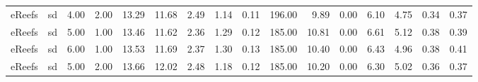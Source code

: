 \begin{table}[ht]
\begin{tabular}{llrrrrrrrrrrrrrr}
  eReefs & sd & 4.00 & 2.00 & 13.29 & 11.68 & 2.49 & 1.14 & 0.11 & 196.00 & 9.89 & 0.00 & 6.10 & 4.75 & 0.34 & 0.37 \\ 
  eReefs & sd & 5.00 & 1.00 & 13.46 & 11.62 & 2.36 & 1.29 & 0.12 & 185.00 & 10.81 & 0.00 & 6.61 & 5.12 & 0.38 & 0.39 \\ 
  eReefs & sd & 6.00 & 1.00 & 13.53 & 11.69 & 2.37 & 1.30 & 0.13 & 185.00 & 10.40 & 0.00 & 6.43 & 4.96 & 0.38 & 0.41 \\ 
  eReefs & sd & 5.00 & 2.00 & 13.66 & 12.02 & 2.48 & 1.18 & 0.12 & 185.00 & 10.20 & 0.00 & 6.30 & 5.02 & 0.36 & 0.37 \\ 
   \bottomrule
\end{tabular}
\endgroup
\end{table}
